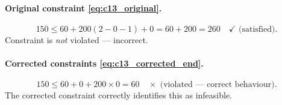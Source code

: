 \documentclass[11pt, a4paper]{article}
\theoremstyle{plain}
\theoremstyle{definition}
\theoremstyle{remark}
\begin{document}
\paragraph{Original constraint \eqref{eq:c13_original}.}
\[
  150 \leq 60 + 200(2 - 0 - 1) + 0 = 60 + 200 = 260 \quad \checkmark \text{ (satisfied)}.
\]
Constraint is \emph{not} violated — incorrect.

\paragraph{Corrected constraints \eqref{eq:c13_corrected_end}.}
\[
  150 \leq 60 + 0 + 200 \times 0 = 60 \quad \times \text{ (violated — correct behaviour)}.
\]
The corrected constraint correctly identifies this as infeasible.



\end{document}
